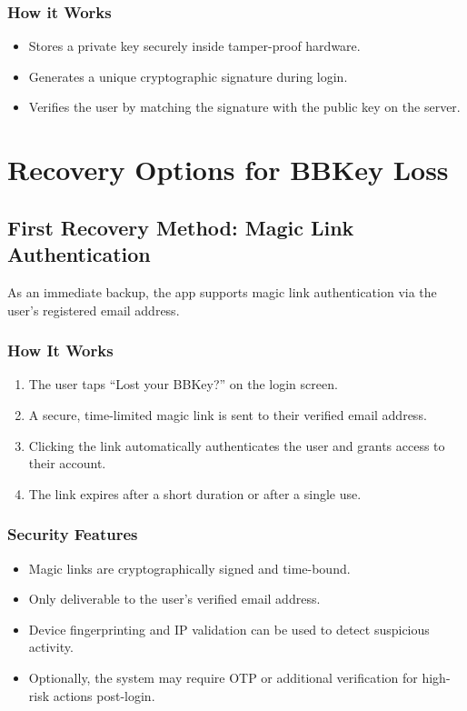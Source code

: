 \documentclass[12pt]{article}
\begin{document}
\subsubsection*{How it Works}
\begin{itemize}
    \item Stores a private key securely inside tamper-proof hardware.
    \item Generates a unique cryptographic signature during login.
    \item Verifies the user by matching the signature with the public key on the server.
\end{itemize}

\section*{Recovery Options for BBKey Loss}

\subsection*{First Recovery Method: Magic Link Authentication}
As an immediate backup, the app supports magic link authentication via the user’s registered email address.

\subsubsection*{How It Works}
\begin{enumerate}
    \item The user taps “Lost your BBKey?” on the login screen.
    \item A secure, time-limited magic link is sent to their verified email address.
    \item Clicking the link automatically authenticates the user and grants access to their account.
    \item The link expires after a short duration or after a single use.
\end{enumerate}

\subsubsection*{Security Features}
\begin{itemize}
    \item Magic links are cryptographically signed and time-bound.
    \item Only deliverable to the user’s verified email address.
    \item Device fingerprinting and IP validation can be used to detect suspicious activity.
    \item Optionally, the system may require OTP or additional verification for high-risk actions post-login.
\end{itemize}
\end{document}
